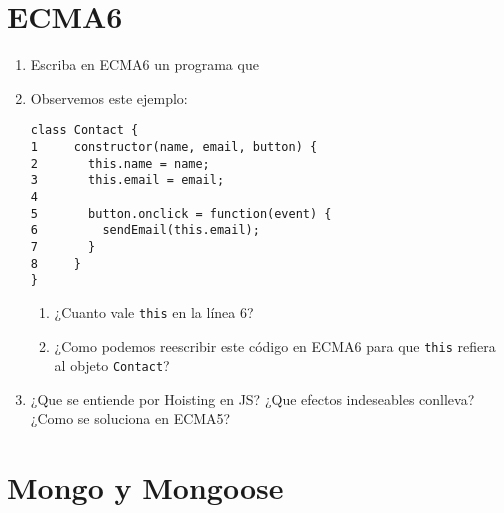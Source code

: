 \documentclass[spanish,a4paper,11pt]{article}
\begin{document}
\section{ECMA6}
\begin{enumerate}
\item Escriba  en ECMA6 un programa que 
\item  Observemos este ejemplo:
\begin{verbatim}
class Contact {
1	  constructor(name, email, button) {
2	    this.name = name;
3	    this.email = email;
4	  
5	    button.onclick = function(event) {
6	      sendEmail(this.email);
7	    }
8	  }
}
\end{verbatim}
\begin{enumerate}
\item  
¿Cuanto vale \verb|this| en la línea 6?
\item ¿Como podemos reescribir este código en ECMA6 para que \verb|this| refiera al objeto \verb|Contact|?
\end{enumerate}

\item 
¿Que se entiende por Hoisting en JS? ¿Que efectos indeseables conlleva? ¿Como se soluciona en ECMA5?
\end{enumerate}

\section{Mongo y Mongoose}
\end{document}
